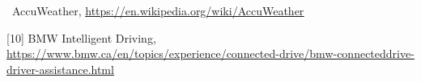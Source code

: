 \documentclass[12pt]{report}
\renewcommand{\_}{\kern-1.5pt\textunderscore\kern-1.5pt}
\begin{document}
\vspace{\baselineskip}
\begin{justify}
[9]\ AccuWeather,  \href{https://en.wikipedia.org/wiki/AccuWeather}{\textcolor[HTML]{1155CC}{\ul{https://en.wikipedia.org/wiki/AccuWeather}}}
\end{justify}\par

[10] BMW Intelligent Driving, \href{https://www.bmw.ca/en/topics/experience/connected-drive/bmw-connecteddrive-driver-assistance.html}{\textcolor[HTML]{1155CC}{\ul{https://www.bmw.ca/en/topics/experience/connected-drive/bmw-connecteddrive-driver-assistance.html}}}\par


\printbibliography
\end{document}
